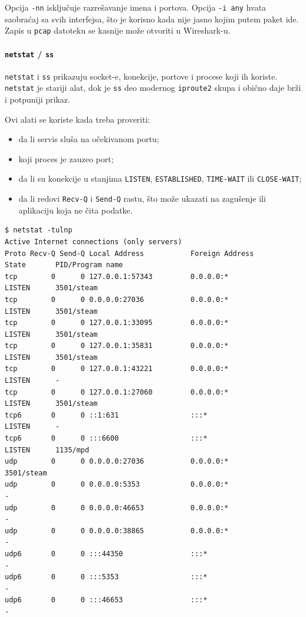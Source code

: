 Opcija \texttt{-nn} isključuje razrešavanje imena i portova. Opcija \texttt{-i any} hvata saobraćaj sa svih interfejsa, što je korisno kada nije jasno kojim putem paket ide. Zapis u \texttt{pcap} datoteku se kasnije može otvoriti u Wireshark-u.

\paragraph{\texorpdfstring{\texttt{netstat} / \texttt{ss}}{netstat / ss}}\label{netstat--ss}

\texttt{netstat} i \texttt{ss} prikazuju socket-e, konekcije, portove i procese koji ih koriste. \texttt{netstat} je stariji alat, dok je \texttt{ss} deo modernog \texttt{iproute2} skupa i obično daje brži i potpuniji prikaz.

Ovi alati se koriste kada treba proveriti:

\begin{itemize}
\tightlist
\item
  da li servis sluša na očekivanom portu;
\item
  koji proces je zauzeo port;
\item
  da li su konekcije u stanjima \texttt{LISTEN}, \texttt{ESTABLISHED}, \texttt{TIME-WAIT} ili \texttt{CLOSE-WAIT};
\item
  da li redovi \texttt{Recv-Q} i \texttt{Send-Q} rastu, što može ukazati na zagušenje ili aplikaciju koja ne čita podatke.
\end{itemize}

\begin{verbatim}
$ netstat -tulnp
Active Internet connections (only servers)
Proto Recv-Q Send-Q Local Address           Foreign Address         State       PID/Program name
tcp        0      0 127.0.0.1:57343         0.0.0.0:*               LISTEN      3501/steam
tcp        0      0 0.0.0.0:27036           0.0.0.0:*               LISTEN      3501/steam
tcp        0      0 127.0.0.1:33095         0.0.0.0:*               LISTEN      3501/steam
tcp        0      0 127.0.0.1:35831         0.0.0.0:*               LISTEN      3501/steam
tcp        0      0 127.0.0.1:43221         0.0.0.0:*               LISTEN      -
tcp        0      0 127.0.0.1:27060         0.0.0.0:*               LISTEN      3501/steam
tcp6       0      0 ::1:631                 :::*                    LISTEN      -
tcp6       0      0 :::6600                 :::*                    LISTEN      1135/mpd
udp        0      0 0.0.0.0:27036           0.0.0.0:*                           3501/steam
udp        0      0 0.0.0.0:5353            0.0.0.0:*                           -
udp        0      0 0.0.0.0:46653           0.0.0.0:*                           -
udp        0      0 0.0.0.0:38865           0.0.0.0:*                           -
udp6       0      0 :::44350                :::*                                -
udp6       0      0 :::5353                 :::*                                -
udp6       0      0 :::46653                :::*                                -
\end{verbatim}

